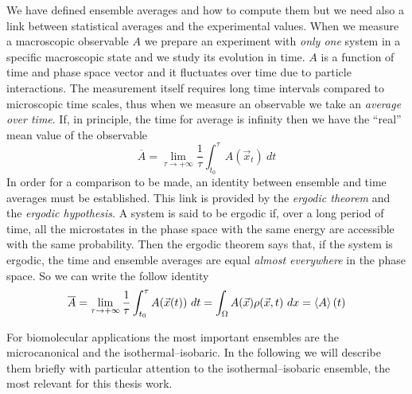 We have defined ensemble averages and how to compute them but we need also a link between statistical averages 
and the experimental values. When we measure a macroscopic observable $A$ we prepare an experiment with 
\textit{only one} system in a specific macroscopic state and we study its evolution in time. $A$ is a function of 
time and phase space vector and it fluctuates over time due to particle interactions. The measurement itself 
requires long time intervals compared to microscopic time scales, thus when we measure an observable we take an 
\textit{average over time}. If, in principle, the time for average is infinity then we have the ``real'' mean 
value of the observable
\begin{equation*}
	\overline{A} = \lim_{\tau\to +\infty}\frac{1}{\tau}\int_{t_0}^\tau A(\vec x_t)\ dt
\end{equation*}
In order for a comparison to be made, an identity between ensemble and time averages must be established.
This link is provided by the \textit{ergodic theorem} and the \textit{ergodic hypothesis}. A system is said to be 
ergodic if, over a long period of time, all the microstates in the phase space with the same energy are 
accessible with the same probability. Then the ergodic theorem says that, if the system is ergodic, the time and 
ensemble averages are equal \textit{almost everywhere} in the phase space. So we can write the follow identity
\begin{equation}
	\overline{A} = \lim_{\tau\to +\infty}\frac{1}{\tau}\int_{t_0}^\tau A(\vec x(t))\ dt = \int_\Omega A(\vec x)\rho(\vec x, t)\ dx = \left \langle A \right \rangle(t)
	\label{eq:ergotic}
\end{equation}

For biomolecular applications the most important ensembles are the microcanonical and the isothermal--isobaric. 
In the following we will describe them briefly with particular attention to the isothermal--isobaric ensemble, 
the most relevant for this thesis work.

